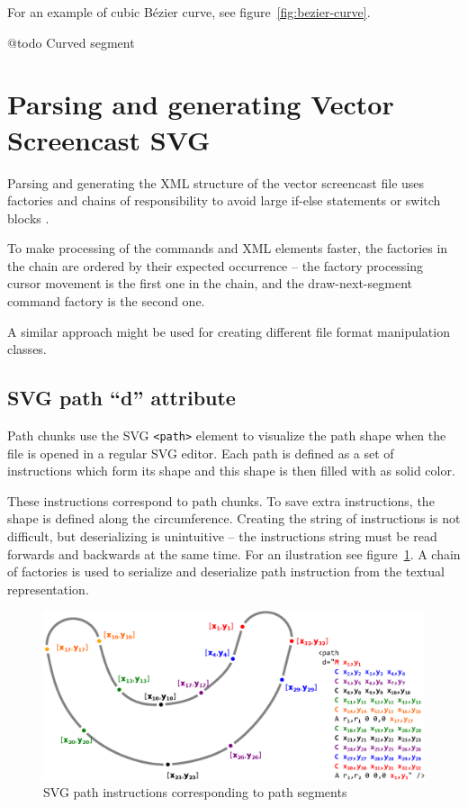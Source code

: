 For an example of cubic Bézier curve, see figure~\ref{fig:bezier-curve}.

@todo Curved segment




\section{Parsing and generating Vector Screencast SVG}
Parsing and generating the XML structure of the vector screencast file uses factories and chains of responsibility to avoid large if-else statements or switch blocks \cite{gang_of_four}.

To make processing of the commands and XML elements faster, the factories in the chain are ordered by their expected occurrence -- the factory processing cursor movement is the first one in the chain, and the draw-next-segment command factory is the second one.

A similar approach might be used for creating different file format manipulation classes.

\subsection{SVG path ``d'' attribute}
\label{sec:path_serialization}
Path chunks use the SVG \verb|<path>| element to visualize the path shape when the file is opened in a regular SVG editor. Each path is defined as a set of instructions which form its shape and this shape is then filled with as solid color.

These instructions correspond to path chunks. To save extra instructions, the shape is defined along the circumference. Creating the string of instructions is not difficult, but deserializing is unintuitive -- the instructions string must be read forwards and backwards at the same time. For an ilustration see figure~\ref{fig:parsing_path}. A chain of factories is used to serialize and deserialize path instruction from the textual representation.

\begin{figure}
	\centering
		\includegraphics[width=130mm]{../img/path_serialization.eps}
		\caption{SVG path instructions corresponding to path segments}
		\label{fig:parsing_path}
\end{figure}



